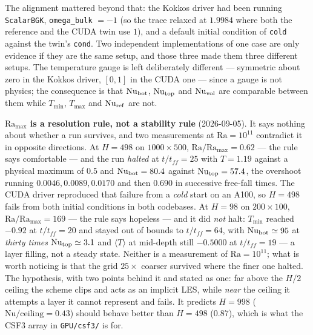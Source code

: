 \documentclass[11pt,a4paper]{article}
\newcommand{\code}[1]{\texttt{\small #1}}
\begin{document}
\begin{enumerate}[leftmargin=1.4em,itemsep=4pt]
  The alignment mattered beyond that: the Kokkos driver had been running
  \code{ScalarBGK}, \code{omega\_bulk} $=-1$ (so the trace relaxed at $1.9984$
  where both the reference and the CUDA twin use $1$), and a default initial
  condition of \code{cold} against the twin's \code{cond}. Two independent
  implementations of one case are only evidence if they are the same setup, and
  those three made them three different setups. The temperature gauge is left
  deliberately different --- symmetric about zero in the Kokkos driver, $[0,1]$
  in the CUDA one --- since a gauge is not physics; the consequence is that
  $\mathrm{Nu}_{\rm bot}$, $\mathrm{Nu}_{\rm top}$ and $\mathrm{Nu}_{\rm vol}$
  are comparable between them while $T_{\min}$, $T_{\max}$ and
  $\mathrm{Nu}_{\rm ref}$ are not.

  \textbf{$\mathrm{Ra_{max}}$ is a resolution rule, not a stability rule}
  (2026-09-05). It says nothing about whether a run survives, and two
  measurements at $\mathrm{Ra}=10^{11}$ contradict it in opposite directions.
  At $H=498$ on $1000\times500$, $\mathrm{Ra}/\mathrm{Ra_{max}}=0.62$ --- the
  rule says comfortable --- and the run \emph{halted} at $t/t_{ff}=25$ with
  $T=1.19$ against a physical maximum of $0.5$ and
  $\mathrm{Nu}_{\rm bot}=80.4$ against $\mathrm{Nu}_{\rm top}=57.4$, the
  overshoot running $0.0046, 0.0089, 0.0170$ and then $0.690$ in successive
  free-fall times. The CUDA driver reproduced that failure from a \emph{cold}
  start on an A100, so $H=498$ fails from both initial conditions in both
  codebases. At $H=98$ on $200\times100$, $\mathrm{Ra}/\mathrm{Ra_{max}}=169$
  --- the rule says hopeless --- and it did \emph{not} halt: $T_{\min}$ reached
  $-0.92$ at $t/t_{ff}=20$ and stayed out of bounds to $t/t_{ff}=64$, with
  $\mathrm{Nu}_{\rm bot}\simeq95$ at \emph{thirty times}
  $\mathrm{Nu}_{\rm top}\simeq3.1$ and $\langle T\rangle$ at mid-depth still
  $-0.5000$ at $t/t_{ff}=19$ --- a layer filling, not a steady state. Neither is
  a measurement of $\mathrm{Ra}=10^{11}$; what is worth noticing is that the
  grid $25\times$ coarser survived where the finer one halted. The hypothesis,
  with two points behind it and stated as one: far above the $H/2$ ceiling the
  scheme clips and acts as an implicit LES, while \emph{near} the ceiling it
  attempts a layer it cannot represent and fails. It predicts $H=998$
  ($\mathrm{Nu}/\mathrm{ceiling}=0.43$) should behave better than $H=498$
  ($0.87$), which is what the CSF3 array in \code{GPU/csf3/} is for.


\end{enumerate}
\end{document}
